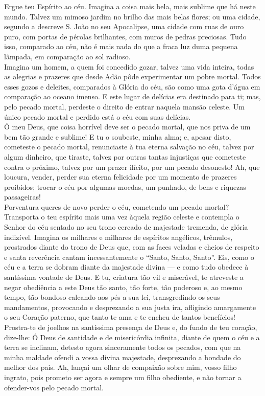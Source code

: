\begin{flushleft}
    Ergue teu Espírito ao céu. Imagina a coisa mais bela, mais sublime que há neste mundo. Talvez um mimoso jardim no brilho das mais belas flores; ou uma cidade, segundo a descreve S. João no seu Apocalipse, uma cidade com ruas de ouro puro, com portas de pérolas brilhantes, com muros de pedras preciosas. Tudo isso, comparado ao céu, não é mais nada do que a fraca luz duma pequena lâmpada, em comparação ao sol radioso.
    \vspace{.2cm} \\
    Imagina um homem, a quem foi concedido gozar, talvez uma vida inteira, todas as alegrias e prazeres que desde Adão pôde experimentar um pobre mortal. Todos esses gozos e deleites, comparados à Glória do céu, são como uma gota d'água em comparação ao oceano imenso. E este lugar de delícias era destinado para ti; mas, pelo pecado mortal, perdeste o direito de entrar naquela mansão celeste. Um único pecado mortal e perdido está o céu com suas delícias.
    \vspace{.2cm} \\
    Ó meu Deus, que coisa horrível deve ser o pecado mortal, que nos priva de um bem tão grande e sublime! E tu o soubeste, minha alma; e, apesar disto, cometeste o pecado mortal, renunciaste à tua eterna salvação no céu, talvez por algum dinheiro, que tiraste, talvez por outras tantas injustiças que cometeste contra o próximo, talvez por um prazer ilícito, por um pecado desonesto! Ah, que loucura, vender, perder sua eterna felicidade por um momento de prazeres proibidos; trocar o céu por algumas moedas, um punhado, de bens e riquezas passageiras!
    \vspace{.2cm} \\
    Porventura queres de novo perder o céu, cometendo um pecado mortal? Transporta o teu espírito mais uma vez àquela região celeste e contempla o Senhor do céu sentado no seu trono cercado de majestade tremenda, de glória indizível. Imagina os milhares e milhares de espíritos angélicos, trêmulos, prostrados diante do trono de Deus que, com as faces veladas e cheios de respeito e santa reverência cantam incessantemente o ``Santo, Santo, Santo''. Eis, como o céu e a terra se dobram diante da majestade divina --- e como tudo obedece à santíssima vontade de Deus.
    \newpage
    E tu, criatura tão vil e miserável, te atreveste a negar obediência a este Deus tão santo, tão forte, tão poderoso e, ao mesmo tempo, tão bondoso calcando aos pés a sua lei, transgredindo os seus mandamentos, provocando e desprezando a sua justa ira, afligindo amargamente o seu Coração paterno, que tanto te ama e te encheu de tantos benefícios! Prostra-te de joelhos na santíssima presença de Deus e, do fundo de teu coração, dize-lhe: Ó Deus de santidade e de misericórdia infinita, diante de quem o céu e a terra se inclinam, detesto agora sinceramente todos os pecados, com que na minha maldade ofendi a vossa divina majestade, desprezando a bondade do melhor dos pais. Ah, lançai um olhar de compaixão sobre mim, vosso filho ingrato, pois prometo ser agora e sempre um filho obediente, e não tornar a ofender-vos pelo pecado mortal.
\end{flushleft}
